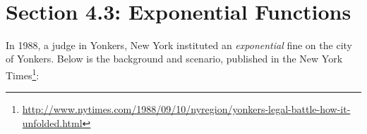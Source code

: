 \documentclass[11pt]{amsart}
\theoremstyle{definition}
\begin{document}
\pagestyle{plain}

\onehalfspace


\fancyhf{}   %
\renewcommand{\headrulewidth}{0.4pt} %
\fancyfootoffset[LE,LO]{0in}        %
\renewcommand{\footrulewidth}{0.4pt} %




\begin{center}
   \\
\end{center}

\section*{\larger[2]  Section 4.3: Exponential Functions}

\vfill

In 1988, a judge in Yonkers, New York instituted an \emph{exponential} fine on the city of Yonkers. Below is the background and scenario, published in the New York Times\footnote{\url{http://www.nytimes.com/1988/09/10/nyregion/yonkers-legal-battle-how-it-unfolded.html}}:
\end{document}
